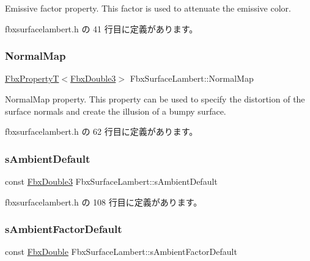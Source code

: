 Emissive factor property. This factor is used to attenuate the emissive color. 

 fbxsurfacelambert.\+h の 41 行目に定義があります。

\mbox{\label{class_fbx_surface_lambert_a2d543c9a3ee42c0443fa7b81ecb54754}} 
\subsubsection{\texorpdfstring{Normal\+Map}{NormalMap}}
{\footnotesize\ttfamily \hyperlink{class_fbx_property_t}{Fbx\+PropertyT}$<$\hyperlink{fbxtypes_8h_ae0a96f14cde566774c7553aa7523b7a7}{Fbx\+Double3}$>$ Fbx\+Surface\+Lambert\+::\+Normal\+Map}

Normal\+Map property. This property can be used to specify the distortion of the surface normals and create the illusion of a bumpy surface. 

 fbxsurfacelambert.\+h の 62 行目に定義があります。

\mbox{\label{class_fbx_surface_lambert_adfa8c3d2c37f85133f85da30434cc084}} 
\subsubsection{\texorpdfstring{s\+Ambient\+Default}{sAmbientDefault}}
{\footnotesize\ttfamily const \hyperlink{fbxtypes_8h_ae0a96f14cde566774c7553aa7523b7a7}{Fbx\+Double3} Fbx\+Surface\+Lambert\+::s\+Ambient\+Default\hspace{0.3cm}{\ttfamily [static]}}



 fbxsurfacelambert.\+h の 108 行目に定義があります。

\mbox{\label{class_fbx_surface_lambert_aaff9847a26203491fd997d015b83c32a}} 
\subsubsection{\texorpdfstring{s\+Ambient\+Factor\+Default}{sAmbientFactorDefault}}
{\footnotesize\ttfamily const \hyperlink{fbxtypes_8h_a171e72a1c46fc15c1a6c9c31948c1c5b}{Fbx\+Double} Fbx\+Surface\+Lambert\+::s\+Ambient\+Factor\+Default\hspace{0.3cm}{\ttfamily [static]}}



